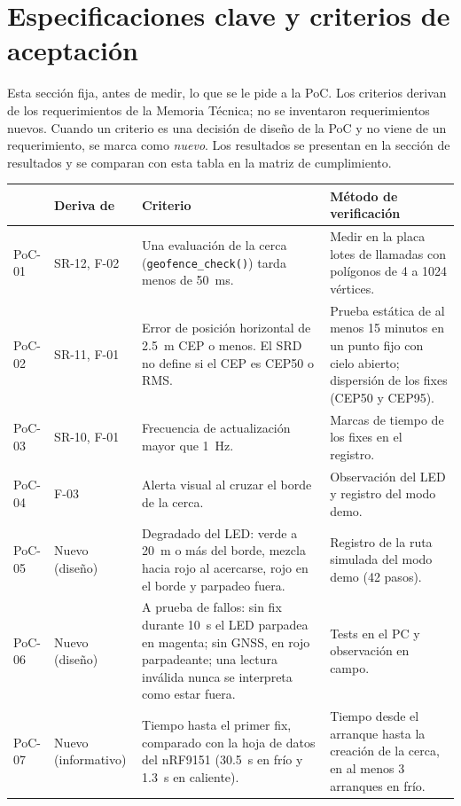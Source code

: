 \section{Especificaciones clave y criterios de aceptación}

Esta sección fija, antes de medir, lo que se le pide a la PoC. Los criterios derivan de los
requerimientos de la Memoria Técnica; no se inventaron requerimientos nuevos. Cuando un criterio
es una decisión de diseño de la PoC y no viene de un requerimiento, se marca como \emph{nuevo}.
Los resultados se presentan en la sección de resultados y se comparan con esta tabla en la
matriz de cumplimiento.

\begin{table}[H]
\centering
\footnotesize
\begin{tabularx}{\textwidth}{|l l X X|}
\hline
\tablehead{\textbf{ID} & \textbf{Deriva de} & \textbf{Criterio} & \textbf{Método de verificación}} \\ \hline
PoC-01 & SR-12, F-02 & Una evaluación de la cerca (\texttt{geofence\_check()}) tarda menos de 50~ms. & Medir en la placa lotes de llamadas con polígonos de 4 a 1024 vértices. \\ \hline
PoC-02 & SR-11, F-01 & Error de posición horizontal de 2.5~m CEP o menos. El SRD no define si el CEP es CEP50 o RMS. & Prueba estática de al menos 15 minutos en un punto fijo con cielo abierto; dispersión de los fixes (CEP50 y CEP95). \\ \hline
PoC-03 & SR-10, F-01 & Frecuencia de actualización mayor que 1~Hz. & Marcas de tiempo de los fixes en el registro. \\ \hline
PoC-04 & F-03 & Alerta visual al cruzar el borde de la cerca. & Observación del LED y registro del modo demo. \\ \hline
PoC-05 & Nuevo (diseño) & Degradado del LED: verde a 20~m o más del borde, mezcla hacia rojo al acercarse, rojo en el borde y parpadeo fuera. & Registro de la ruta simulada del modo demo (42 pasos). \\ \hline
PoC-06 & Nuevo (diseño) & A prueba de fallos: sin fix durante 10~s el LED parpadea en magenta; sin GNSS, en rojo parpadeante; una lectura inválida nunca se interpreta como estar fuera. & Tests en el PC y observación en campo. \\ \hline
PoC-07 & Nuevo (informativo) & Tiempo hasta el primer fix, comparado con la hoja de datos del nRF9151 (30.5~s en frío y 1.3~s en caliente). & Tiempo desde el arranque hasta la creación de la cerca, en al menos 3 arranques en frío. \\ \hline

\end{tabularx}
\end{table}
